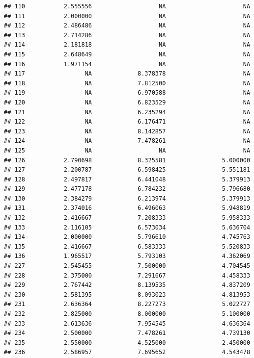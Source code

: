 \documentclass[]{article}
\begin{document}
\begin{verbatim}
## 110           2.555556                   NA                      NA
## 111           2.000000                   NA                      NA
## 112           2.486486                   NA                      NA
## 113           2.714286                   NA                      NA
## 114           2.181818                   NA                      NA
## 115           2.648649                   NA                      NA
## 116           1.971154                   NA                      NA
## 117                 NA             8.378378                      NA
## 118                 NA             7.812500                      NA
## 119                 NA             6.970588                      NA
## 120                 NA             6.823529                      NA
## 121                 NA             6.235294                      NA
## 122                 NA             6.176471                      NA
## 123                 NA             8.142857                      NA
## 124                 NA             7.478261                      NA
## 125                 NA                   NA                      NA
## 126           2.790698             8.325581                5.000000
## 127           2.200787             6.598425                5.551181
## 128           2.497817             6.441048                5.379913
## 129           2.477178             6.784232                5.796680
## 130           2.384279             6.213974                5.379913
## 131           2.374016             6.496063                5.948819
## 132           2.416667             7.208333                5.958333
## 133           2.116105             6.573034                5.636704
## 134           2.000000             5.796610                4.745763
## 135           2.416667             6.583333                5.520833
## 136           1.965517             5.793103                4.362069
## 227           2.545455             7.500000                4.704545
## 228           2.375000             7.291667                4.458333
## 229           2.767442             8.139535                4.837209
## 230           2.581395             8.093023                4.813953
## 231           2.636364             8.227273                5.022727
## 232           2.825000             8.000000                5.100000
## 233           2.613636             7.954545                4.636364
## 234           2.500000             7.478261                4.739130
## 235           2.550000             4.525000                2.450000
## 236           2.586957             7.695652                4.543478

\end{verbatim}
\end{document}
